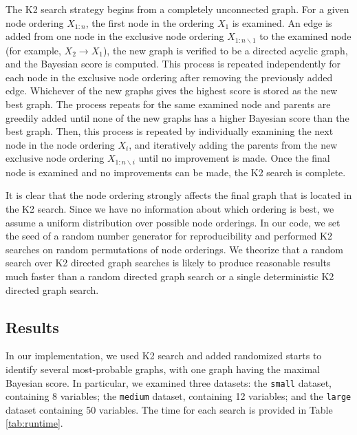 \documentclass[10pt,letterpaper]{article}
\begin{document}
	The K2 search strategy begins from a completely unconnected graph. For a given node ordering $X_{1:n}$, the first node in the ordering $X_1$ is examined. An edge is added from one node in the exclusive node ordering $X_{1:n \backslash 1}$ to the examined node (for example, $X_2\to X_1$), the new graph is verified to be a directed acyclic graph, and the Bayesian score is computed. This process is repeated independently for each node in the exclusive node ordering after removing the previously added edge. Whichever of the new graphs gives the highest score is stored as the new best graph. The process repeats for the same examined node and parents are greedily added until none of the new graphs has a higher Bayesian score than the best graph. Then, this process is repeated by individually examining the next node in the node ordering $X_i$, and iteratively adding the parents from the new exclusive node ordering $X_{1:n\backslash i}$ until no improvement is made. Once the final node is examined and no improvements can be made, the K2 search is complete.
	
	\vspace*{0.1 in}
	
	It is clear that the node ordering strongly affects the final graph that is located in the K2 search. Since we have no information about which ordering is best, we assume a uniform distribution over possible node orderings. In our code, we set the seed of a random number generator for reproducibility and performed K2 searches on random permutations of node orderings. We theorize that a random search over K2 directed graph searches is likely to produce reasonable results much faster than a random directed graph search or a single deterministic K2 directed graph search. 
	
	\subsection*{\sf \textbf{Results}}
	
	In our implementation, we used K2 search and added randomized starts to identify several most-probable graphs, with one graph having the maximal Bayesian score. In particular, we examined three datasets: the \texttt{small} dataset, containing 8 variables; the \texttt{medium} dataset, containing 12 variables; and the \texttt{large} dataset containing 50 variables. The time for each search is provided in Table \ref{tab:runtime}.
\end{document}
